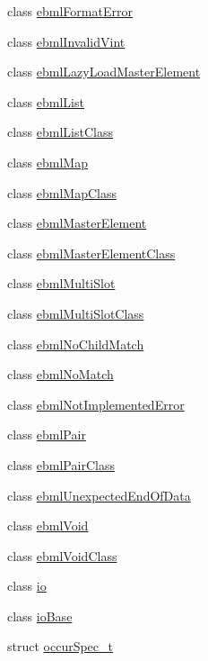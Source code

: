 \begin{DoxyCompactItemize}
class \mbox{\hyperlink{classebml_1_1ebmlFormatError}{ebml\+Format\+Error}}
\item 
class \mbox{\hyperlink{classebml_1_1ebmlInvalidVint}{ebml\+Invalid\+Vint}}
\item 
class \mbox{\hyperlink{classebml_1_1ebmlLazyLoadMasterElement}{ebml\+Lazy\+Load\+Master\+Element}}
\item 
class \mbox{\hyperlink{classebml_1_1ebmlList}{ebml\+List}}
\item 
class \mbox{\hyperlink{classebml_1_1ebmlListClass}{ebml\+List\+Class}}
\item 
class \mbox{\hyperlink{classebml_1_1ebmlMap}{ebml\+Map}}
\item 
class \mbox{\hyperlink{classebml_1_1ebmlMapClass}{ebml\+Map\+Class}}
\item 
class \mbox{\hyperlink{classebml_1_1ebmlMasterElement}{ebml\+Master\+Element}}
\item 
class \mbox{\hyperlink{classebml_1_1ebmlMasterElementClass}{ebml\+Master\+Element\+Class}}
\item 
class \mbox{\hyperlink{classebml_1_1ebmlMultiSlot}{ebml\+Multi\+Slot}}
\item 
class \mbox{\hyperlink{classebml_1_1ebmlMultiSlotClass}{ebml\+Multi\+Slot\+Class}}
\item 
class \mbox{\hyperlink{classebml_1_1ebmlNoChildMatch}{ebml\+No\+Child\+Match}}
\item 
class \mbox{\hyperlink{classebml_1_1ebmlNoMatch}{ebml\+No\+Match}}
\item 
class \mbox{\hyperlink{classebml_1_1ebmlNotImplementedError}{ebml\+Not\+Implemented\+Error}}
\item 
class \mbox{\hyperlink{classebml_1_1ebmlPair}{ebml\+Pair}}
\item 
class \mbox{\hyperlink{classebml_1_1ebmlPairClass}{ebml\+Pair\+Class}}
\item 
class \mbox{\hyperlink{classebml_1_1ebmlUnexpectedEndOfData}{ebml\+Unexpected\+End\+Of\+Data}}
\item 
class \mbox{\hyperlink{classebml_1_1ebmlVoid}{ebml\+Void}}
\item 
class \mbox{\hyperlink{classebml_1_1ebmlVoidClass}{ebml\+Void\+Class}}
\item 
class \mbox{\hyperlink{classebml_1_1io}{io}}
\item 
class \mbox{\hyperlink{classebml_1_1ioBase}{io\+Base}}
\item 
struct \mbox{\hyperlink{structebml_1_1occurSpec__t}{occur\+Spec\+\_\+t}}
\item 

\end{DoxyCompactItemize}
